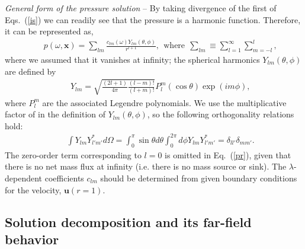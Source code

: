 \documentclass[aps,prx,twocolumn,amsmath,amssymb,amsfonts]{revtex4-2}
\begin{document}
\textit{General form of the pressure solution} -- By taking divergence of the first of Eqs.~(\ref{is}) we can readily see that the pressure is a harmonic function. Therefore, it can be represented as,
\begin{eqnarray}&&\!\!\!\!\!\!\!\!\!\!\!
p(\omega, \bm x)\!=\!\sum_{lm}\!\frac{c_{lm}(\omega)Y_{lm}(\theta, \phi)}{r^{l+1}}, \ \ \mathrm{where}\ \ \sum_{lm} \!\equiv \!\sum_{l=1}^{\infty}\!\!\sum_{m=-l}^{l}\!,\!\label{pr}
\end{eqnarray}
where we assumed that it vanishes at infinity; the spherical harmonics $Y_{lm}(\theta, \phi)$ are defined by
\begin{eqnarray}&&
Y_{lm}=\sqrt{\frac{(2l+1)}{4\pi}\frac{(l-m)!}{(l+m)!}}P_l^m(\cos\theta)\exp\left(im\phi\right),
\label{fi}
\end{eqnarray}
where $P_l^m$ are the associated Legendre polynomials. We use the multiplicative factor of \cite{sph} in the definition of $Y_{lm}(\theta, \phi)$, so the following orthogonality relations hold:
\begin{eqnarray}&&
\int Y_{lm} Y^*_{l'm'}d\Omega=\int_0^{\pi}\sin\theta d\theta\int_0^{2\pi}d\phi Y_{lm} Y^*_{l'm'}=\delta_{l l'}\delta_{m m'}.\nonumber
\end{eqnarray}
The zero-order term corresponding to $l=0$ is omitted in Eq.~(\ref{pr}), given that there is no net mass flux at infinity (i.e. there is no mass source or sink). The $\lambda$-dependent coefficients $c_{lm}$ should be determined from given boundary conditions for the velocity, $\bm u(r=1)$.

\subsection{Solution decomposition and its far-field behavior}
\end{document}
